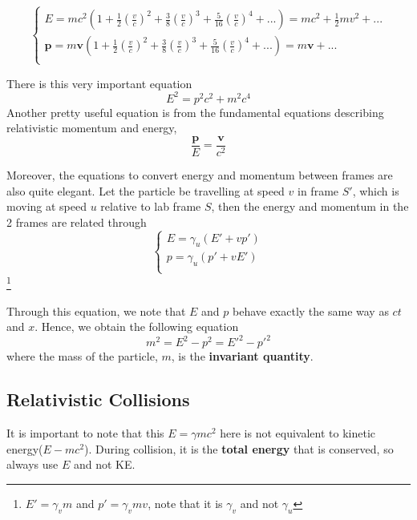\begin{equation}
    \begin{cases}
        E=mc^2(1+\frac{1}{2}(\frac{v}{c})^2+\frac{3}{8}(\frac{v}{c})^3+\frac{5}{16}(\frac{v}{c})^4+...)=mc^2+\frac{1}{2}mv^2+...\\
        \mathbf{p}=m \mathbf{v}(1+\frac{1}{2}(\frac{v}{c})^2+\frac{3}{8}(\frac{v}{c})^3+\frac{5}{16}(\frac{v}{c})^4+...)=m\mathbf{v}+...\\
    \end{cases}
\end{equation}

There is this very important equation
\begin{equation}
    E^2=p^2c^2+m^2c^4
\end{equation}
Another pretty useful equation is from the fundamental equations describing relativistic momentum and energy, 
\begin{equation}
    \frac{\mathbf{p}}{E}=\frac{\mathbf{v}}{c^2}
\end{equation}

Moreover, the equations to convert energy and momentum between frames are also quite elegant. Let the particle be travelling at speed $v$ in frame $S'$, which is moving at speed $u$ relative to lab frame $S$, then the energy and momentum in the 2 frames are related through
\begin{equation}
    \begin{cases}
        E=\gamma_u(E'+vp')\\
        p=\gamma_u(p'+vE')\\
    \end{cases}
\end{equation} \footnote{$E'=\gamma_v m$ and $p'=\gamma_v m v$, note that it is $\gamma_v$ and not $\gamma_u$}

Through this equation, we note that $E$ and $p$ behave exactly the same way as $ct$ and $x$. Hence, we obtain the following equation
\begin{equation}
    m^2=E^2-p^2=E'^2-p'^2
\end{equation}
where the mass of the particle, $m$, is the \textbf{invariant quantity}.

\subsection{Relativistic Collisions}
It is important to note that this $E=\gamma mc^2$ here is not equivalent to kinetic energy($E-mc^2$). During collision, it is the \textbf{total energy} that is conserved, so always use $E$ and not KE. 


